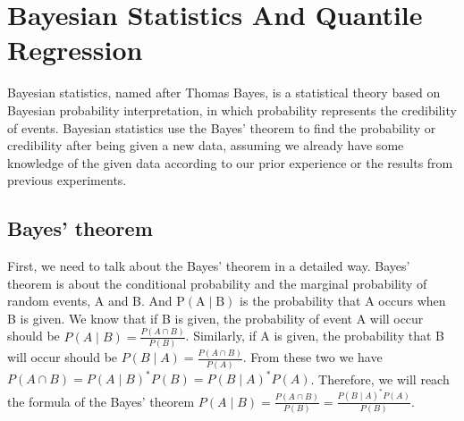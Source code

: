 \documentclass[mstat,12pt]{unswthesis}  %
\numberwithin{equation}{section}
\begin{document}
\chapter{Bayesian Statistics And Quantile Regression}
Bayesian statistics, named after Thomas Bayes, is a statistical theory based on Bayesian probability interpretation, in which probability represents the credibility of events. Bayesian statistics use the Bayes' theorem to find the probability or credibility after being given a new data, assuming we already have some knowledge of the given data according to our prior experience or the results from previous experiments.

\section{Bayes' theorem}
First, we need to talk about the Bayes' theorem in a detailed way.
Bayes' theorem is about the conditional probability and the marginal probability of random events, A and B. And $\mathrm{P}(\mathrm{A} \mid \mathrm{B})$ is the probability that A occurs when B is given. We know that if B is given, the probability of event A will occur should be $P(A \mid B)=\frac{P(A \cap B)}{P(B)}$. Similarly, if A is given, the probability that B will occur should be $P(B \mid A)=\frac{P(A \cap B)}{P(A)}$. From these two we have $P(A \cap B)=P(A \mid B)^{*} P(B)=P(B \mid A)^{*} P(A)$. Therefore, we will reach the formula of the Bayes' theorem $P(A \mid B)=\frac{P(A \cap B)}{P(B)}=\frac{P(B \mid A)^{*} P(A)}{P(B)}$.
\end{document}
